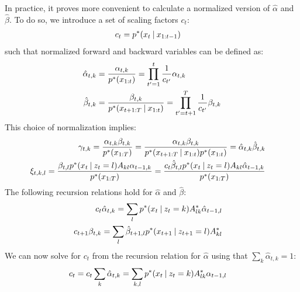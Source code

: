 In practice, it proves more convenient to calculate a normalized version of $\hat{\alpha}$ and $\hat{\beta}$. To do so, we introduce a set of scaling factors $c_t$:
\begin{align}
  \begin{split}
    c_t &= p^*(x_t \:|\: x_{1:t-1})
  \end{split} 
\end{align}
such that normalized forward and backward variables can be defined as:
\begin{align}
  \begin{split}
    \hat{\alpha}_{t,k} &= \frac{\alpha_{t,k}}{p^*(x_{1:t})} 
                        = \prod_{t'=1}^t \frac{1}{c_{t'}} \alpha_{t,k}  \\
    \hat{\beta}_{t,k} &= \frac{\beta_{t,k}}{p^*(x_{t+1:T} \:|\: x_{1:t})} 
                        = \prod_{t'=t+1}^T \frac{1}{c_{t'}} \beta_{t,k} 
  \end{split}
\end{align}
This choice of normalization implies:
\begin{align}
  \begin{split}
    \gamma_{t,k}
    &=
    \frac{\alpha_{t,k}\beta_{t,k}}{p^*(x_{1:T})} 
    = \frac{\alpha_{t,k}\beta_{t,k}}{p^*(x_{t+1:T} \:|\: x_{1:t}) p^*(x_{1:t})} 
    = \hat{\alpha}_{t,k} \hat{\beta}_{t,k} 
  \end{split}\\
  \begin{split}
    \xi_{t,k,l}
      &= \frac{\beta_{t,l} p^*(x_t \:|\: z_t=l) A_{kl} \alpha_{t-1,k} }{p^*(x_{1:T})} 
      = \frac{c_t \hat{\beta}_{t,l} p^*(x_t \:|\: z_t=l) A_{kl} \hat{\alpha}_{t-1,k} }{p^*(x_{1:T})}
  \end{split}
 \end{align}
The following recursion relations hold for $\hat{\alpha}$ and $\hat{\beta}$:
\begin{align}
  \begin{split}
    c_t \hat{\alpha}_{t,k}  
    &= \sum_l p^*(x_t \:|\: z_t=k) A^*_{lk} \hat{\alpha}_{t-1,l}
  \end{split}\\ 
  \begin{split}
    c_{t+1} \beta_{t,k} 
    &= \sum_l \hat{\beta}_{t+1,l} p^*(x_{t+1} \:|\: z_{t+1}=l) A^*_{kl} 
  \end{split} 
\end{align}
We can now solve for $c_t$ from the recursion relation for $\hat{\alpha}$ using that $\sum_k \hat{\alpha}_{t,k} = 1$:
\begin{align}
  \begin{split}
    c_t 
    &=
    c_t
    \sum_k
    \hat{\alpha}_{t,k}  
    = 
    \sum_{k,l} p^*(x_t \:|\: z_t=k) A^*_{lk} \alpha_{t-1,l}
  \end{split} 
\end{align}

